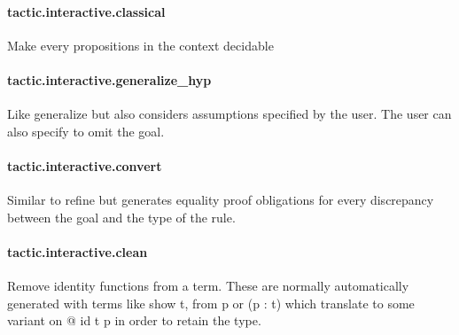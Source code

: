 \documentclass{article}
\begin{document}
\paragraph{tactic.interactive.classical}
\par
Make every propositions in the context decidable
\paragraph{tactic.interactive.generalize\_hyp}
\par
Like 
\colorbox[RGB]{253,246,227}{{{{\color[RGB]{101, 123, 131} generalize }}}} but also considers assumptions
specified by the user. The user can also specify to
omit the goal.
\paragraph{tactic.interactive.convert}
\par
Similar to 
\colorbox[RGB]{253,246,227}{{{{\color[RGB]{101, 123, 131} refine }}}} but generates equality proof obligations
for every discrepancy between the goal and the type of the rule.
\paragraph{tactic.interactive.clean}
\par
Remove identity functions from a term. These are normally
automatically generated with terms like 
\colorbox[RGB]{253,246,227}{{{{\color[RGB]{133, 153, 0} show }}}{{{\color[RGB]{101, 123, 131}  t,  }}}{{{\color[RGB]{133, 153, 0} from }}}{{{\color[RGB]{101, 123, 131}  p }}}} or
\colorbox[RGB]{253,246,227}{{{{\color[RGB]{101, 123, 131} (p : t) }}}} which translate to some variant on 
\colorbox[RGB]{253,246,227}{{{{\color[RGB]{181, 137, 0} @ }}}{{{\color[RGB]{101, 123, 131} id t p }}}} in
order to retain the type.
\end{document}
